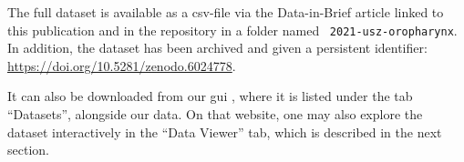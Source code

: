 \begin{tcolorbox}[
    title=\faIcon{database} Data,
    parbox=false,
    float
]
    The full dataset is available as a \acrshort{csv}-file via the Data-in-Brief article linked to this publication \cite{ludwig_dataset_2022} and in the repository  in a folder named ~\texttt{2021-usz-oropharynx}. In addition, the dataset has been archived and given a persistent identifier: \url{https://doi.org/10.5281/zenodo.6024778}.

    It can also be downloaded from our \gls{gui} \inlinelyproxlogo{}, where it is listed under the tab ``Datasets'', alongside our data. On that website, one may also explore the dataset interactively in the ``Data Viewer'' tab, which is described in the next section.
\end{tcolorbox}
